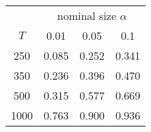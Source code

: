 % 
\begin{tabular}{cccc}
  \hline
  & \multicolumn{3}{c}{nominal size $\alpha$} \\
 $T$ & 0.01 & 0.05 & 0.1 \\
 \hline
250 & 0.085 & 0.252 & 0.341 \\ 
  350 & 0.236 & 0.396 & 0.470 \\ 
  500 & 0.315 & 0.577 & 0.669 \\ 
  1000 & 0.763 & 0.900 & 0.936 \\ 
   \hline
\end{tabular}
